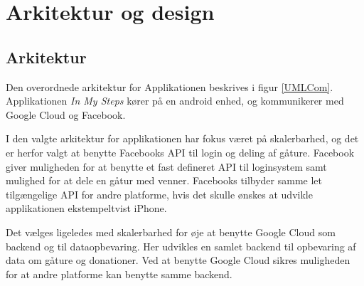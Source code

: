 \thispagestyle{fancy}
\chapter{Arkitektur og design}
\label{chp:description}

\section{Arkitektur}
Den overordnede arkitektur for Applikationen beskrives i figur \ref{UMLCom}. Applikationen \emph{In My Steps} kører på en android enhed, og kommunikerer med Google Cloud og Facebook.

I den valgte arkitektur for applikationen har fokus været på skalerbarhed, og det er herfor valgt at benytte Facebooks API til login og deling af gåture. Facebook giver muligheden for at benytte et fast defineret API til loginsystem samt mulighed for at dele en gåtur med venner. Facebooks tilbyder samme let tilgængelige API for andre platforme, hvis det skulle ønskes at udvikle applikationen ekstempeltvist iPhone.

Det vælges ligeledes med skalerbarhed for øje at benytte Google Cloud som backend og til dataopbevaring. Her udvikles en samlet backend til opbevaring af data om gåture og donationer. Ved at benytte Google Cloud sikres muligheden for at andre platforme kan benytte samme backend. 

